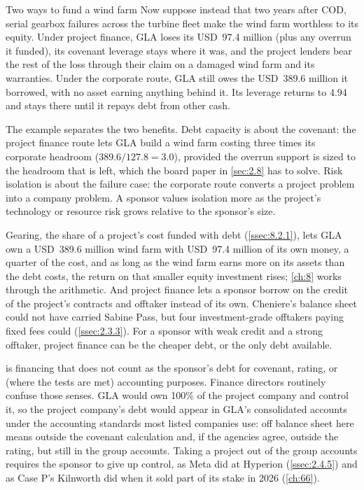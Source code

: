 \begin{example}{Two ways to fund a wind farm \illustrative}
Now suppose instead that two years after COD, serial gearbox failures across the turbine fleet make the wind farm worthless to its equity. Under project finance, GLA loses its USD~97.4 million (plus any overrun it funded), its covenant leverage stays where it was, and the project lenders bear the rest of the loss through their claim on a damaged wind farm and its warranties. Under the corporate route, GLA still owes the USD~389.6 million it borrowed, with no asset earning anything behind it. Its leverage returns to 4.94\x{} and stays there until it repays debt from other cash.
\end{example}

The example separates the two benefits. Debt capacity is about the covenant: the project finance route lets GLA build a wind farm costing three times its corporate headroom ($389.6 / 127.8 = 3.0$), provided the overrun support is sized to the headroom that is left, which the board paper in \cref{sec:2.8} has to solve. Risk isolation is about the failure case: the corporate route converts a project problem into a company problem. A sponsor values isolation more as the project's technology or resource risk grows relative to the sponsor's size.

Gearing, the share of a project's cost funded with debt (\cref{ssec:8.2.1}), lets GLA own a USD~389.6 million wind farm with USD~97.4 million of its own money, a quarter of the cost, and as long as the wind farm earns more on its assets than the debt costs, the return on that smaller equity investment rises; \cref{ch:8} works through the arithmetic. And project finance lets a sponsor borrow on the credit of the project's contracts and offtaker instead of its own. Cheniere's balance sheet could not have carried Sabine Pass, but four investment-grade offtakers paying fixed fees could (\cref{ssec:2.3.3}). For a sponsor with weak credit and a strong offtaker, project finance can be the cheaper debt, or the only debt available.

 is financing that does not count as the sponsor's debt for covenant, rating, or (where the tests are met) accounting purposes. Finance directors routinely confuse those senses. GLA would own 100\% of the project company and control it, so the project company's debt would appear in GLA's consolidated accounts under the accounting standards most listed companies use: off balance sheet here means outside the covenant calculation and, if the agencies agree, outside the rating, but still in the group accounts. Taking a project out of the group accounts requires the sponsor to give up control, as Meta did at Hyperion (\cref{ssec:2.4.5}) and as Case P's Kilnworth did when it sold part of its stake in 2026 (\cref{ch:66}).


